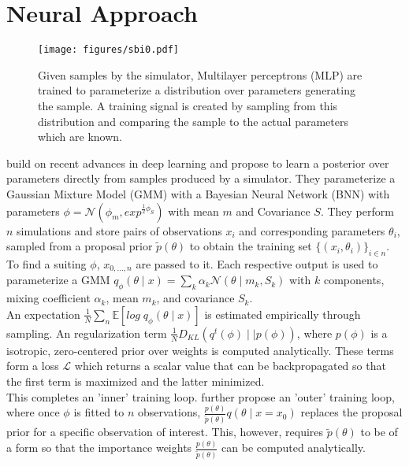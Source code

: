 \documentclass[12pt]{article}
\begin{document}
 



\section*{Neural Approach}
\begin{figure}
	\centering
	\texttt{[image: figures/sbi0.pdf]}
	\caption{Given samples by the simulator, Multilayer perceptrons (MLP) are trained to parameterize a distribution over parameters generating the sample. A training signal is created by sampling from this distribution and comparing the sample to the actual parameters which are known.}
	\label{fig:sbiloop}
\end{figure} 
\citet{papamakarios2016fast} build on recent advances in deep learning and propose to learn a posterior over parameters directly from samples produced by a simulator. They parameterize a Gaussian Mixture Model (GMM) with a Bayesian Neural Network (BNN) with parameters $\phi = \mathcal{N}(\phi_m, exp^{\frac{1}{2}\phi_S})$ with mean $m$ and Covariance $S$. They perform $n$ simulations and store pairs of observations $x_i$ and corresponding parameters $\theta_i$, sampled from a proposal prior $\tilde{p}(\theta)$ to obtain the  training set $\lbrace(x_i,\theta_i)\rbrace_{i \in n}$. 
To find a suiting $\phi$, $x_{0,...,n}$ are passed to it. Each respective output is used to parameterize a GMM $q_{\phi}(\theta\mid x) = \sum_k \alpha_k \mathcal{N}(\theta\mid m_k, S_k)$ with $k$ components, mixing coefficient $\alpha_k$, mean $m_k$, and covariance $S_k$. \\
An expectation $\frac{1}{N} \sum_n\mathbb{E} \left[ log\;q_{\phi}(\theta \mid x)\right]$ is estimated empirically through sampling. An regularization term $\frac{1}{N}\mathit{D}_{KL}(q^t(\phi) \mid\mid p(\phi))$, where $p(\phi)$ is a isotropic, zero-centered prior over weights is computed analytically. These terms form a loss $\mathcal{L}$ which returns a scalar value that can be backpropagated so that the first term is maximized and the latter minimized.\\
This completes an 'inner' training loop. \citet{papamakarios2016fast} further propose an 'outer' training loop, where once $\phi$ is fitted to $n$ observations, $\frac{p(\theta)}{\tilde{p}(\theta)}q(\theta \mid  x=x_0)$ replaces the proposal prior for a specific observation of interest. This, however, requires $\tilde{p}(\theta)$ to be of a form so that the importance weights $\frac{p(\theta)}{\tilde{p}(\theta)}$ can be computed analytically.
\end{document}
